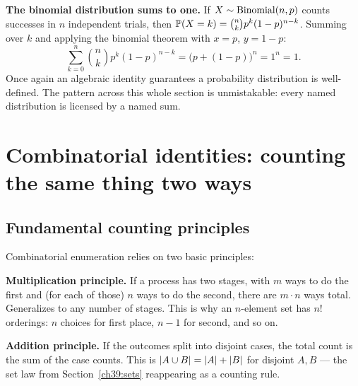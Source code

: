 \begin{applicationbox}
\textbf{The binomial distribution sums to one.} If $X \sim \Bin(n,p)$ counts
successes in $n$ independent trials, then $\P(X=k) = \binom{n}{k}p^k(1-p)^{n-k}$.
Summing over $k$ and applying the binomial theorem with $x=p$, $y=1-p$:
\[
  \sum_{k=0}^{n}\binom{n}{k}p^{k}(1-p)^{n-k} = \big(p + (1-p)\big)^{n}
  = 1^{n} = 1.
\]
Once again an algebraic identity guarantees a probability distribution is
well-defined. The pattern across this whole section is unmistakable: every
named distribution is licensed by a named sum.
\end{applicationbox}

\section{Combinatorial identities: counting the same thing two ways}
\label{ch39:counting}

\subsection{Fundamental counting principles}

Combinatorial enumeration relies on two basic principles:

\textbf{Multiplication principle.} If a process has two stages, with $m$ ways
to do the first and (for each of those) $n$ ways to do the second, there are
$m \cdot n$ ways total. Generalizes to any number of stages. This is why an
$n$-element set has $n!$ orderings: $n$ choices for first place, $n-1$ for
second, and so on.

\textbf{Addition principle.} If the outcomes split into disjoint cases, the
total count is the sum of the case counts. This is $\abs{A \cup B} =
\abs{A} + \abs{B}$ for disjoint $A, B$ --- the set law from
Section~\ref{ch39:sets} reappearing as a counting rule.

